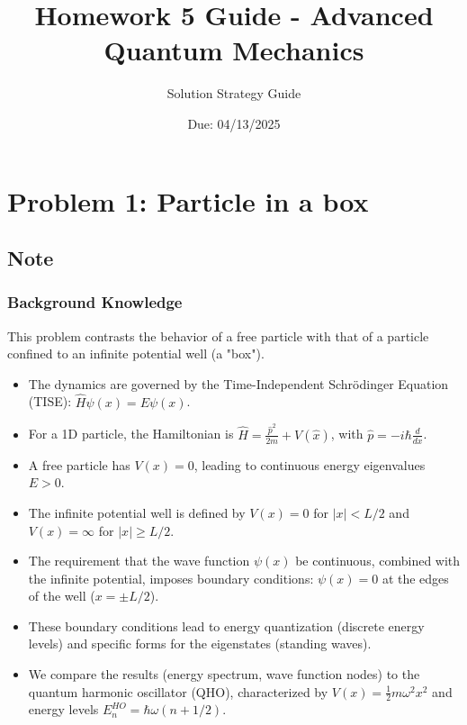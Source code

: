 \documentclass[10pt]{article}
\title{Homework 5 Guide - Advanced Quantum Mechanics}
\date{Due: 04/13/2025}
\author{Solution Strategy Guide}
\begin{document}
\maketitle

\section*{Problem 1: Particle in a box}

\subsection*{Note}

\subsubsection*{Background Knowledge}
This problem contrasts the behavior of a free particle with that of a particle confined to an infinite potential well (a "box").
\begin{itemize}
    \item The dynamics are governed by the Time-Independent Schrödinger Equation (TISE): \(\hat{H}\psi(x) = E\psi(x)\).
    \item For a 1D particle, the Hamiltonian is \(\hat{H} = \frac{\hat{p}^2}{2m} + V(\hat{x})\), with \(\hat{p} = -i\hbar \frac{d}{dx}\).
    \item A free particle has \(V(x) = 0\), leading to continuous energy eigenvalues \(E > 0\).
    \item The infinite potential well is defined by \(V(x) = 0\) for \(|x| < L/2\) and \(V(x) = \infty\) for \(|x| \ge L/2\).
    \item The requirement that the wave function \(\psi(x)\) be continuous, combined with the infinite potential, imposes boundary conditions: \(\psi(x) = 0\) at the edges of the well (\(x = \pm L/2\)).
    \item These boundary conditions lead to energy quantization (discrete energy levels) and specific forms for the eigenstates (standing waves).
    \item We compare the results (energy spectrum, wave function nodes) to the quantum harmonic oscillator (QHO), characterized by \(V(x) = \frac{1}{2}m\omega^2 x^2\) and energy levels \(E_n^{HO} = \hbar\omega(n+1/2)\).
\end{itemize}
\end{document}
